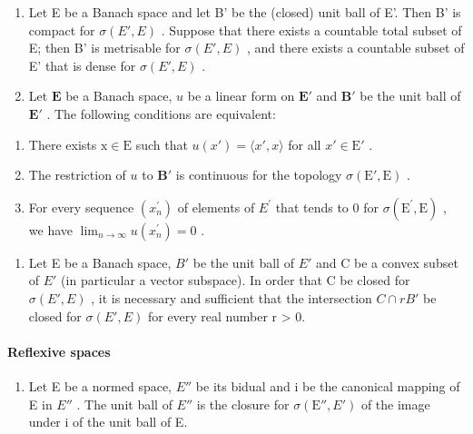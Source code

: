 \begin{enumerate}
\def\labelenumi{\arabic{enumi})}
\setcounter{enumi}{18}
\item
  Let E be a Banach space and let B' be the (closed) unit ball of E'. Then B' is compact for \(\sigma(E', E)\) . Suppose that there exists a countable total subset of E; then B' is metrisable for \(\sigma(E', E)\) , and there exists a countable subset of E' that is dense for \(\sigma(E', E)\) .
\item
  Let \(\mathbf{E}\) be a Banach space, \(u\) be a linear form on \(\mathbf{E}'\) and \(\mathbf{B}'\) be the unit ball of \(\mathbf{E}'\) . The following conditions are equivalent:
\end{enumerate}

\begin{enumerate}
\def\labelenumi{(\roman{enumi})}
\item
  There exists \(\mathrm{x} \in \mathrm{E}\) such that \(u(x') = \langle x', x \rangle\) for all \(x' \in \mathrm{E}'\) .
\item
  The restriction of \(u\) to \(\mathbf{B}'\) is continuous for the topology \(\sigma(\mathrm{E}', \mathrm{E})\) .
\item
  For every sequence \((x_{n}^{\prime})\) of elements of \(E^{\prime}\) that tends to 0 for \(\sigma(\mathrm{E}^{\prime}, \mathrm{E})\) , we have \(\lim_{n \to \infty} u(x_{n}^{\prime}) = 0\) .
\end{enumerate}

\begin{enumerate}
\def\labelenumi{\arabic{enumi})}
\setcounter{enumi}{20}
\tightlist
\item
  Let E be a Banach space, \(B'\) be the unit ball of \(E'\) and C be a convex subset of \(E'\) (in particular a vector subspace). In order that C be closed for \(\sigma(E', E)\) , it is necessary and sufficient that the intersection \(C \cap rB'\) be closed for \(\sigma(E', E)\) for every real number r \textgreater{} 0.
\end{enumerate}

\paragraph{Reflexive spaces}

\begin{enumerate}
\def\labelenumi{\arabic{enumi})}
\setcounter{enumi}{21}
\tightlist
\item
   Let E be a normed space, \(E''\) be its bidual and i be the canonical mapping of E in \(E''\) . The unit ball of \(E''\) is the closure for \(\sigma(\mathrm{E}'', E')\) of the image under i of the unit ball of E.
\end{enumerate}

